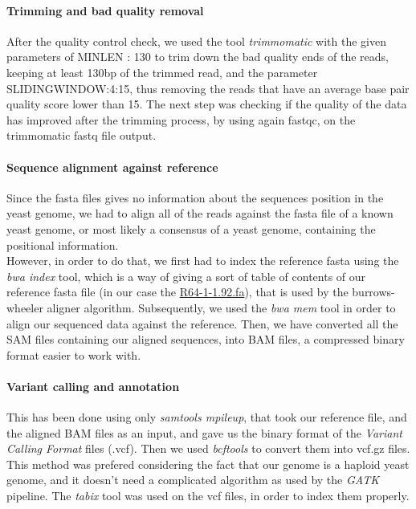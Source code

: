 \documentclass[10pt,a4paper]{article}
\begin{document}
\paragraph{Trimming and bad quality removal } After the quality control check, we used the tool \textit{trimmomatic}\cite{bolger_trimmomatic:_2014} with the given parameters of MINLEN : 130 to trim down the bad quality ends of the reads, keeping at least 130bp of the trimmed read, and the parameter SLIDINGWINDOW:4:15, thus removing the reads that have an average base pair quality score lower than 15. The next step was checking if the quality of the data has improved after the trimming process, by using again fastqc, on the trimmomatic fastq file output.

\paragraph{Sequence alignment against reference} Since the fasta files gives no information about the sequences position in the yeast genome, we had to align all of the reads against the fasta file of a known yeast genome, or most likely a consensus of a yeast genome, containing the positional information.\\
 
\noindent However, in order to do that, we first had to index the reference fasta using the \textit{bwa index} tool\cite{li_fast_2010}, which is a way of giving a sort of table of contents of our reference fasta file (in our case the \href{https://www.ensembl.org/Saccharomyces_cerevisiae/Info/Index}{R64-1-1.92.fa}), that is used by the burrows-wheeler aligner algorithm. Subsequently, we used the \textit{bwa mem} tool in order to align our sequenced data against the reference. Then, we have converted all the SAM\cite{li_sequence_2009} files containing our aligned sequences, into BAM files, a compressed binary format easier to work with.
 
\paragraph{Variant calling and annotation}
This has been done using only \textit{samtools mpileup}, that took our reference file, and the aligned BAM files as an input, and gave us the binary format of the \textit{Variant Calling Format} files (.vcf). Then we used \textit{bcftools} to convert them into vcf.gz files. This method was prefered considering the fact that our genome is a haploid yeast genome, and it doesn’t need a complicated algorithm as used by the \textit{GATK} pipeline. The \textit{tabix}\cite{li_tabix:_2011} tool was used on the vcf files, in order to index them properly.\\
\end{document}
